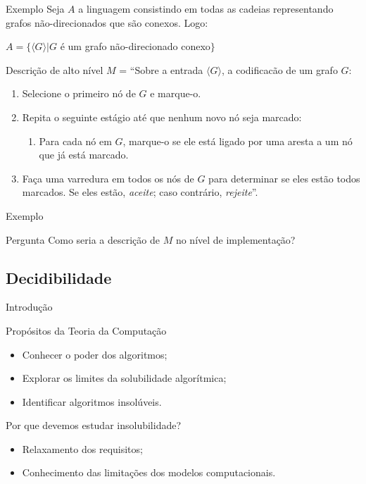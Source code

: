 \documentclass[xcolor=dvipsnames,table]{beamer}
\begin{document}
	\begin{frame}[shrink]{Exemplo}
		Seja $A$ a linguagem consistindo em todas as cadeias representando grafos não-direcionados que são conexos. Logo:
		\begin{center}
			$A = \{\langle G \rangle | G$ é um grafo não-direcionado conexo$\}$
		\end{center}
		\begin{block}{Descrição de alto nível}
			$M$ = ``Sobre a entrada $\langle G \rangle$, a codificacão de um grafo $G$:
			\begin{enumerate}
				\item Selecione o primeiro nó de $G$ e marque-o.
				\item Repita o seguinte estágio até que nenhum novo nó seja marcado:
				\begin{enumerate}
					\item Para cada nó em $G$, marque-o se ele está ligado por uma aresta a um nó que já está marcado.
				\end{enumerate}
				\item Faça uma varredura em todos os nós de $G$ para determinar se eles estão todos marcados. Se eles estão, {\it aceite}; caso contrário, {\it rejeite}''.
			\end{enumerate}
		\end{block}
	\end{frame}
	
	\begin{frame}{Exemplo}
		\begin{block}{Pergunta}
			Como seria a descrição de $M$ no nível de implementação?
		\end{block}
	\end{frame}

	\subsection{Decidibilidade}
	\begin{frame}{Introdução}
		\begin{block}{Propósitos da Teoria da Computação}
			\begin{itemize}
				\item Conhecer o poder dos algoritmos;
				\item Explorar os limites da solubilidade algorítmica;
				\item Identificar algoritmos insolúveis.
			\end{itemize}
		\end{block}
		\begin{block}{Por que devemos estudar insolubilidade?}
			\begin{itemize}
				\item Relaxamento dos requisitos;
				\item Conhecimento das limitações dos modelos computacionais.
			\end{itemize}
		\end{block}
	\end{frame}
\end{document}
